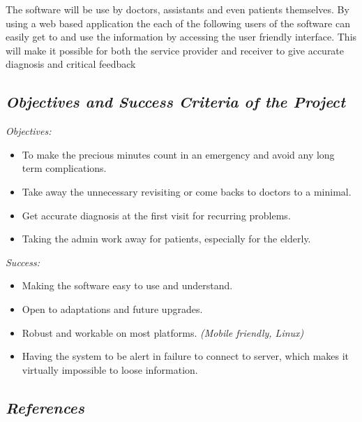 \documentclass[a4paper]{article}
\begin{document}
The software will be use by doctors, assistants and even patients themselves. By using a web based application the each of the following users of the software can easily get to and use the information by accessing the user friendly interface. This will make it possible for both the service provider and receiver to give accurate diagnosis and critical feedback

\subsection{\textit{Objectives and Success Criteria of the Project}}

\emph{Objectives:}

\begin{itemize} 

\item To make the precious minutes count in an emergency and avoid any long term complications.

\item Take away the unnecessary revisiting or come backs to doctors to a minimal.

\item Get accurate diagnosis at the first visit for recurring problems.

\item Taking the admin work away for patients, especially for the elderly.

\end{itemize}

\emph{Success:}

\begin{itemize} 

\item Making the software easy to use and understand.

\item Open to adaptations and future upgrades.

\item Robust and workable on most platforms. \emph{(Mobile friendly, Linux)}

\item Having the system to be alert in failure to connect to server, which makes it virtually impossible to loose information. 

\end{itemize}
		
\subsection{\textit{References}}
\end{document}
